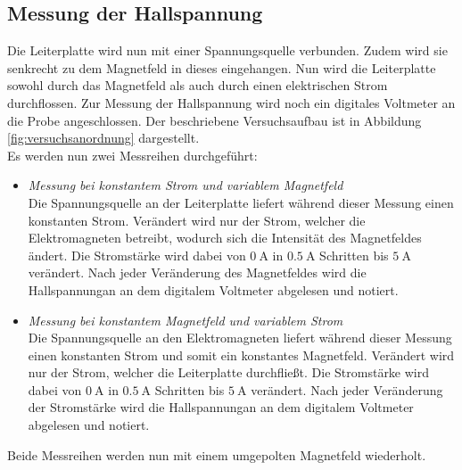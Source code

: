 \subsection{Messung der Hallspannung}
Die Leiterplatte wird nun mit einer Spannungsquelle verbunden. Zudem wird sie 
senkrecht zu dem Magnetfeld in dieses eingehangen. Nun wird die Leiterplatte sowohl durch das Magnetfeld
als auch durch einen elektrischen Strom durchflossen. Zur Messung der Hallspannung wird noch ein 
digitales Voltmeter an die Probe angeschlossen. Der beschriebene Versuchsaufbau ist in Abbildung
\ref{fig:versuchsanordnung} dargestellt.\\
Es werden nun zwei Messreihen durchgeführt:
\begin{itemize}
    \item \textit{Messung bei konstantem Strom und variablem Magnetfeld}\\
        Die Spannungsquelle an der Leiterplatte liefert während dieser Messung einen konstanten Strom. 
        Verändert wird nur der Strom, welcher die Elektromagneten betreibt, wodurch sich die Intensität
        des Magnetfeldes ändert. Die Stromstärke wird dabei von $\SI{0}{\ampere}$ in $\SI{0.5}{\ampere}$
        Schritten bis $\SI{5}{\ampere}$ verändert. Nach jeder Veränderung des Magnetfeldes wird die 
        Hallspannungan an dem digitalem Voltmeter abgelesen und notiert.\\
    \item \textit{Messung bei konstantem Magnetfeld und variablem Strom}\\
        Die Spannungsquelle an den Elektromagneten liefert während dieser Messung einen konstanten Strom und 
        somit ein konstantes Magnetfeld. 
        Verändert wird nur der Strom, welcher die Leiterplatte durchfließt.
        Die Stromstärke wird dabei von $\SI{0}{\ampere}$ in $\SI{0.5}{\ampere}$
        Schritten bis $\SI{5}{\ampere}$ verändert. Nach jeder Veränderung der Stromstärke wird die 
        Hallspannungan an dem digitalem Voltmeter abgelesen und notiert.\\
\end{itemize}
Beide Messreihen werden nun mit einem umgepolten Magnetfeld wiederholt.